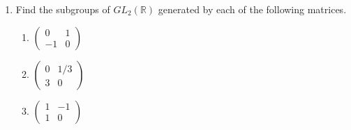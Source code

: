 {\begin{enumerate}
\begin{enumerate}
 \item
All subgroups of ${\mathbb Z}_{12}$
 
 \item
All subgroups of ${\mathbb Z}_{60}$
 
 \item
All subgroups of ${\mathbb Z}_{13}$
 
 \item
All subgroups of ${\mathbb Z}_{48}$
 
 \item
The subgroup generated by 3  in $U(20)$
 
 \item
The subgroup generated by 6  in $U(18)$
 
 \item
The subgroup of ${\mathbb R}^\ast$ generated by 7
 
 \item
The subgroup of ${\mathbb C}^\ast$ generated by $i$ where $i^2 = -1$
 
 \item
The subgroup of ${\mathbb C}^\ast$ generated by $2i$
 
 \item
The subgroup of ${\mathbb C}^\ast$ generated by $(1 + i) / \sqrt{2}$
 
 \item
The subgroup of ${\mathbb C}^\ast$ generated by $(1 + \sqrt{3}\, i) / 2$
 
\end{enumerate}
 
 
\item
Find the subgroups of $GL_2( {\mathbb R })$ generated by each of the
following matrices. 
\begin{multicols}{3}
\begin{enumerate}
 
\item
$\displaystyle
\begin{pmatrix}
0 & 1 \\
-1 & 0
\end{pmatrix}
$

\item
$\displaystyle
\begin{pmatrix}
0 & 1/3 \\
3 & 0
\end{pmatrix}
$

\item
$\displaystyle
\begin{pmatrix}
1 & -1 \\
1 & 0
\end{pmatrix}
$


\end{enumerate}
\end{multicols}
\end{enumerate}}
